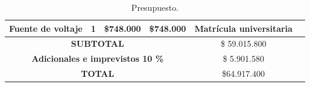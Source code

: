 \begin{landscape}
\begin{table}[H]
\begin{tabular}{|c|c|c|c|c|c|}
        Fuente de voltaje& 1& \$748.000& \$748.000& Matrícula universitaria \\ \hline
          \multicolumn{4}{|c|}{\textbf{SUBTOTAL}}                                                                           &  \$ 59.015.800     \\ \hline
         \multicolumn{4}{|c|}{\textbf{Adicionales e imprevistos 10 \%}}                                                             &      \$ 5.901.580           \\ \hline
        \multicolumn{4}{|c|}{\textbf{TOTAL}}   &  \$64.917.400 \\ \hline
    \end{tabular}
     \caption{Presupuesto.}
    \label{presupuesto}
\end{table}

\end{landscape}
